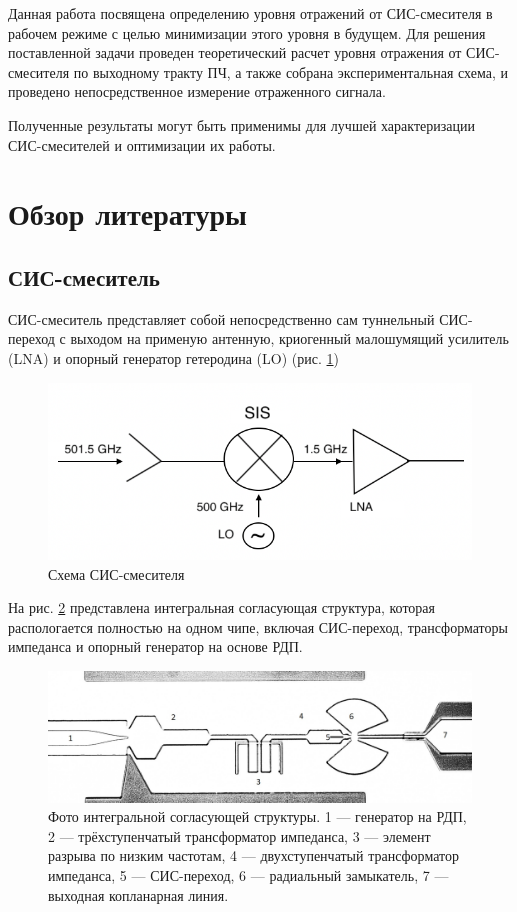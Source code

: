 \documentclass[a4paper]{article}
\begin{document}
Данная работа посвящена определению уровня отражений от 
СИС-смесителя в рабочем режиме с целью минимизации этого уровня в будущем. Для решения поставленной задачи проведен теоретический расчет уровня 
отражения от СИС-смесителя по выходному тракту ПЧ, а также собрана экспериментальная схема, и проведено непосредственное измерение отраженного сигнала.
\par

Полученные результаты могут быть применимы для лучшей характеризации СИС-смесителей и оптимизации их работы.


\newpage
\section{Обзор литературы}

\subsection{СИС-смеситель}

СИС-смеситель представляет собой непосредственно сам туннельный СИС-переход с выходом на применую антенную, криогенный малошумящий усилитель (LNA) и опорный генератор гетеродина (LO) (рис. \ref{fig:scheme2})

\begin{figure}[H]
    \centering
    \includegraphics[scale=0.8]{scheme2.png}
    \caption{Схема СИС-смесителя}
    \label{fig:scheme2}
\end{figure}

На рис. \ref{fig:hd32} представлена интегральная согласующая структура, которая распологается полностью на одном чипе, включая СИС-переход, трансформаторы импеданса и опорный генератор на основе РДП.

\begin{figure}[H]
    \centering
    \includegraphics[scale=0.4]{HD32.jpg}
    \caption{Фото интегральной согласующей структуры. 1 — генератор на РДП, 2 — трёхступенчатый трансформатор импеданса, 3 — элемент разрыва по низким частотам, 4 — двухступенчатый трансформатор импеданса, 5 — СИС-переход, 6 — радиальный замыкатель, 7 — выходная копланарная линия.}
    \label{fig:hd32}
\end{figure}
\end{document}
